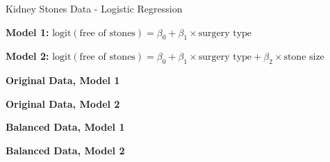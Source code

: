\documentclass[8pt,aspectratio=169]{beamer}
\newcommand{\bs}{\vspace{\baselineskip}}
\newcommand{\logit}{\text{logit}}
\begin{document}
\begin{frame}{Kidney Stones Data - Logistic Regression}

  {\bfseries Model 1:}
  \(
    \logit(\text{free of stones}) = \beta_0 + \beta_1 \times
    \text{surgery type}
  \)

  \bs

  {\bfseries Model 2:}
  \(
    \logit(\text{free of stones}) = \beta_0 + \beta_1 \times
    \text{surgery type} + \beta_2 \times \text{stone size}
  \)

  \bs \bs

  \begin{minipage}[t]{.5\textwidth}

    \centering

    {\bfseries Original Data, Model 1}

    

  \end{minipage}%
  \begin{minipage}[t]{.5\textwidth}

    \centering

    {\bfseries Original Data, Model 2}

    

  \end{minipage}

  \bs

  \begin{minipage}[t]{.5\textwidth}

    \centering

    {\bfseries Balanced Data, Model 1}

    

  \end{minipage}%
  \begin{minipage}[t]{.5\textwidth}

    \centering

    {\bfseries Balanced Data, Model 2}

    

  \end{minipage}

\end{frame}

\end{document}
